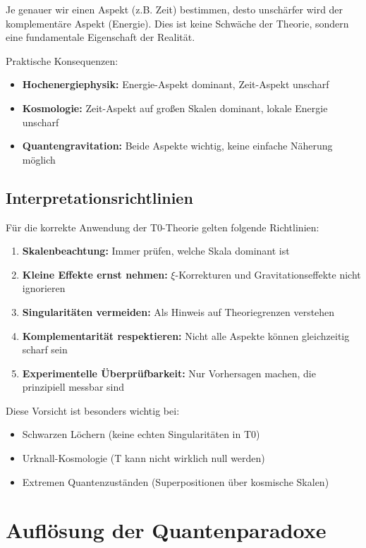 \documentclass[12pt,a4paper]{article}
\begin{document}
	Je genauer wir einen Aspekt (z.B. Zeit) bestimmen, desto unschärfer wird der komplementäre Aspekt (Energie). Dies ist keine Schwäche der Theorie, sondern eine fundamentale Eigenschaft der Realität.
	
	Praktische Konsequenzen:
	\begin{itemize}
		\item \textbf{Hochenergiephysik:} Energie-Aspekt dominant, Zeit-Aspekt unscharf
		\item \textbf{Kosmologie:} Zeit-Aspekt auf großen Skalen dominant, lokale Energie unscharf
		\item \textbf{Quantengravitation:} Beide Aspekte wichtig, keine einfache Näherung möglich
	\end{itemize}
	
	\subsection{Interpretationsrichtlinien}
	
	Für die korrekte Anwendung der T0-Theorie gelten folgende Richtlinien:
	
	\begin{enumerate}
		\item \textbf{Skalenbeachtung:} Immer prüfen, welche Skala dominant ist
		\item \textbf{Kleine Effekte ernst nehmen:} $\xi$-Korrekturen und Gravitationseffekte nicht ignorieren
		\item \textbf{Singularitäten vermeiden:} Als Hinweis auf Theoriegrenzen verstehen
		\item \textbf{Komplementarität respektieren:} Nicht alle Aspekte können gleichzeitig scharf sein
		\item \textbf{Experimentelle Überprüfbarkeit:} Nur Vorhersagen machen, die prinzipiell messbar sind
	\end{enumerate}
	
	Diese Vorsicht ist besonders wichtig bei:
	\begin{itemize}
		\item Schwarzen Löchern (keine echten Singularitäten in T0)
		\item Urknall-Kosmologie (T kann nicht wirklich null werden)
		\item Extremen Quantenzuständen (Superpositionen über kosmische Skalen)
	\end{itemize}
	
	\section{Auflösung der Quantenparadoxe}
	
\end{document}
